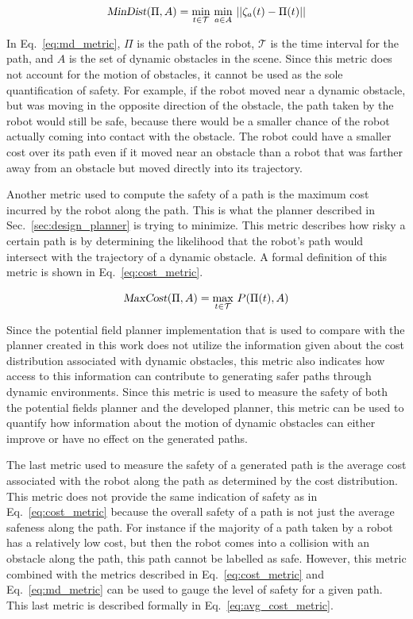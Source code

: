 \documentclass[letterpaper, 10pt, conference]{ieeeconf}
\newcommand{\Var}[1]{\ensuremath{{{\textsl{#1}}}}}
\begin{document}
\begin{equation}
    \Var{MinDist}(\Pi, A) = \min_{t \in \mathcal{T}} \, \min_{a \in A} \,
    ||\zeta_a(t) - \Pi(t)||
    \label{eq:md_metric}
\end{equation}

In Eq.~\ref{eq:md_metric}, $\Pi$ is the path of the robot, $\mathcal{T}$ is the
time interval for the path, and $A$ is the set of dynamic obstacles in the
scene. Since this metric does not account for the motion of obstacles, it
cannot be used as the sole quantification of safety. For example, if the robot
moved near a dynamic obstacle, but was moving in the opposite direction of the
obstacle, the path taken by the robot would still be safe, because there would
be a smaller chance of the robot actually coming into contact with the
obstacle. The robot could have a smaller cost over its path even if it moved
near an obstacle than a robot that was farther away from an obstacle but moved
directly into its trajectory.

Another metric used to compute the safety of a path is the maximum cost
incurred by the robot along the path. This is what the planner described in
Sec.~\ref{sec:design_planner} is trying to minimize. This metric describes how
risky a certain path is by determining the likelihood that the robot's path
would intersect with the trajectory of a dynamic obstacle. A formal definition
of this metric is shown in Eq.~\ref{eq:cost_metric}.

\begin{equation}
    \Var{MaxCost}(\Pi, A) = \max_{t \in \mathcal{T}} \, P(\Pi(t), A)
    \label{eq:cost_metric}
\end{equation}

Since the potential field planner implementation that is used to compare with
the planner created in this work does not utilize the information given about
the cost distribution associated with dynamic obstacles, this metric also
indicates how access to this information can contribute to generating safer
paths through dynamic environments. Since this metric is used to measure the
safety of both the potential fields planner and the developed planner, this
metric can be used to quantify how information about the motion of dynamic
obstacles can either improve or have no effect on the generated paths.

The last metric used to measure the safety of a generated path is the average
cost associated with the robot along the path as determined by the cost
distribution. This metric does not provide the same indication of safety as in
Eq.~\ref{eq:cost_metric} because the overall safety of a path is not just the
average safeness along the path.  For instance if the majority of a path taken
by a robot has a relatively low cost, but then the robot comes into a collision
with an obstacle along the path, this path cannot be labelled as safe.
However, this metric combined with the metrics described in
Eq.~\ref{eq:cost_metric} and Eq.~\ref{eq:md_metric} can be used to gauge the
level of safety for a given path. This last metric is described formally in
Eq.~\ref{eq:avg_cost_metric}.
\end{document}
